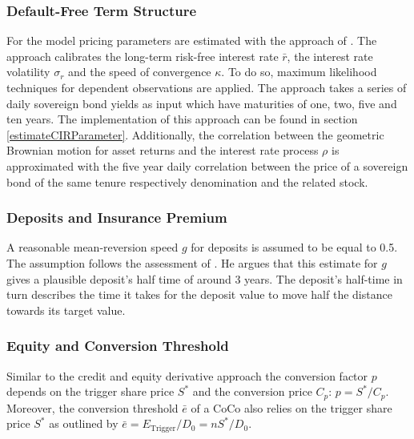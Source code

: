 \subsubsection*{Default-Free Term Structure}
For the \citet{cox1985theory} model pricing parameters are estimated with the approach of \citet{remillard2013statistical}. The approach calibrates the long-term risk-free interest rate $\bar{r}$, the interest rate volatility $\sigma_r$ and the speed of convergence $\kappa$. To do so, maximum likelihood techniques for dependent observations are applied. The approach takes a series of daily sovereign bond yields as input which have maturities of one, two, five and ten years. The implementation of this approach can be found in section \ref{estimateCIRParameter}. Additionally, the correlation between the geometric Brownian motion for asset returns and the interest rate process $\rho$ is approximated with the five year daily correlation between the price of a sovereign bond of the same tenure respectively denomination and the related stock.

\subsubsection*{Deposits and Insurance Premium}
A reasonable mean-reversion speed $g$ for deposits is assumed to be equal to 0.5. The assumption follows the assessment of \citet{pennacchi2010structural}. He argues that this estimate for $g$ gives a plausible deposit's half time of around 3 years. The deposit's half-time in turn describes the time it takes for the deposit value to move half the distance towards its target value.

\subsubsection*{Equity and Conversion Threshold}
Similar to the credit and equity derivative approach the conversion factor $p$ depends on the trigger share price $S^*$ and the conversion price $C_p$: $p = S^*/C_p$. Moreover, the conversion threshold $\bar{e}$ of a CoCo also relies on the trigger share price $S^*$ as outlined by $\bar{e} = E_\text{Trigger}/D_0 = n S^*/D_0$.

